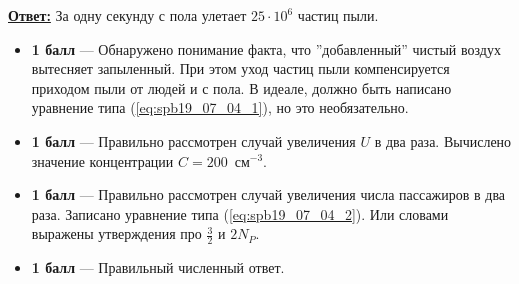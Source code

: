 \underline{\textbf{Ответ:}} За одну секунду с пола улетает $25 \cdot 10^6$ частиц пыли.

\begin{itemize}
\item \textbf{1 балл} --- Обнаружено понимание факта, что ''добавленный'' чистый воздух вытесняет запыленный. При этом уход частиц пыли компенсируется приходом пыли от людей и с пола. В идеале, должно быть написано уравнение типа (\ref{eq:spb19_07_04_1}), но это необязательно.

\item \textbf{1 балл} --- Правильно рассмотрен случай увеличения $U$ в два раза. Вычислено значение концентрации $C = 200$~см$^{-3}$.

\item \textbf{1 балл} --- Правильно рассмотрен случай увеличения числа пассажиров в два раза. Записано уравнение типа (\ref{eq:spb19_07_04_2}). Или словами выражены утверждения про $\frac{3}{2}$ и $2 N_P$.

\item \textbf{1 балл} --- Правильный численный ответ.

\end{itemize}


